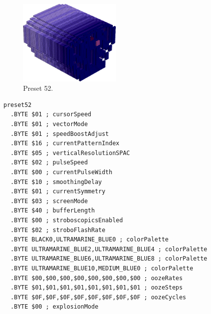 \begin{minipage}[b]{0.48\linewidth}
\begin{figure}[H]                                                          
  \centering                                                             
  \begin{adjustbox}{width=5cm,center}                                   
  \includegraphics[width=5cm]{src/colorspace_presets/preset52-45.png}%
  \end{adjustbox}                                                        
\caption*{Preset 52.}                                           
\end{figure}                                                               
\end{minipage}
\hspace{0.1cm}
\begin{minipage}[b]{0.48\linewidth}                                       
\begin{lstlisting}[basicstyle=\ttfamily\tiny]
preset52
  .BYTE $01 ; cursorSpeed
  .BYTE $01 ; vectorMode
  .BYTE $01 ; speedBoostAdjust
  .BYTE $16 ; currentPatternIndex
  .BYTE $05 ; verticalResolutionSPAC
  .BYTE $02 ; pulseSpeed
  .BYTE $00 ; currentPulseWidth
  .BYTE $10 ; smoothingDelay
  .BYTE $01 ; currentSymmetry
  .BYTE $03 ; screenMode
  .BYTE $40 ; bufferLength
  .BYTE $00 ; stroboscopicsEnabled
  .BYTE $02 ; stroboFlashRate
  .BYTE BLACK0,ULTRAMARINE_BLUE0 ; colorPalette
  .BYTE ULTRAMARINE_BLUE2,ULTRAMARINE_BLUE4 ; colorPalette
  .BYTE ULTRAMARINE_BLUE6,ULTRAMARINE_BLUE8 ; colorPalette
  .BYTE ULTRAMARINE_BLUE10,MEDIUM_BLUE0 ; colorPalette
  .BYTE $00,$00,$00,$00,$00,$00,$00,$00 ; oozeRates
  .BYTE $01,$01,$01,$01,$01,$01,$01,$01 ; oozeSteps
  .BYTE $0F,$0F,$0F,$0F,$0F,$0F,$0F,$0F ; oozeCycles
  .BYTE $00 ; explosionMode
\end{lstlisting}
\end{minipage}


